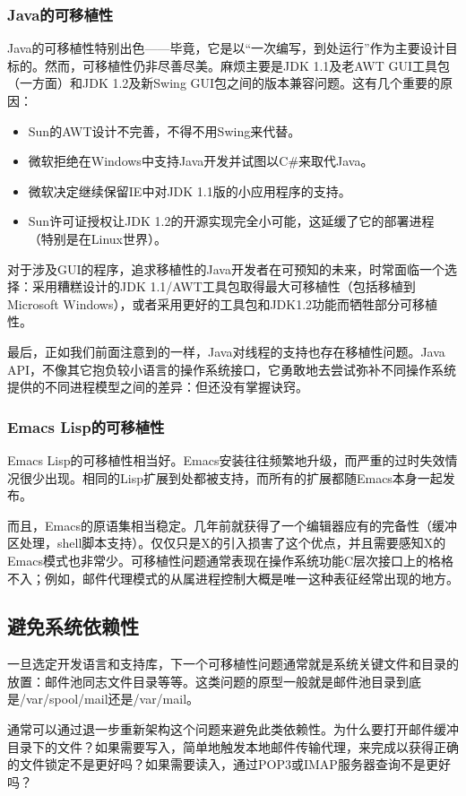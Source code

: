 \documentclass[12pt,oneside]{ctexbook}
\begin{document}
\begin{common-format}
\subsubsection{Java的可移植性}
Java的可移植性特别出色——毕竟，它是以“一次编写，到处运行”作为主要设计目标的。然而，可移植性仍非尽善尽美。麻烦主要是JDK 1.1及老AWT GUI工具包（一方面）和JDK 1.2及新Swing GUI包之间的版本兼容问题。这有几个重要的原因：
\begin{itemize}
\item Sun的AWT设计不完善，不得不用Swing来代替。
\item 微软拒绝在Windows中支持Java开发并试图以C\#{}来取代Java。
\item 微软决定继续保留IE中对JDK 1.1版的小应用程序的支持。
\item Sun许可证授权让JDK 1.2的开源实现完全小可能，这延缓了它的部署进程（特别是在Linux世界）。
\end{itemize}

对于涉及GUI的程序，追求移植性的Java开发者在可预知的未来，时常面临一个选择：采用糟糕设计的JDK 1.1/AWT工具包取得最大可移植性（包括移植到Microsoft Windows），或者采用更好的工具包和JDK1.2功能而牺牲部分可移植性。

最后，正如我们前面注意到的一样，Java对线程的支持也存在移植性问题。Java API，不像其它抱负较小语言的操作系统接口，它勇敢地去尝试弥补不同操作系统提供的不同进程模型之间的差异：但还没有掌握诀窍。

\subsubsection{Emacs Lisp的可移植性}
Emacs Lisp的可移植性相当好。Emacs安装往往频繁地升级，而严重的过时失效情况很少出现。相同的Lisp扩展到处都被支持，而所有的扩展都随Emacs本身一起发布。

而且，Emacs的原语集相当稳定。几年前就获得了一个编辑器应有的完备性（缓冲区处理，shell脚本支持）。仅仅只是X的引入损害了这个优点，并且需要感知X的Emacs模式也非常少。可移植性问题通常表现在操作系统功能C层次接口上的格格不入；例如，邮件代理模式的从属进程控制大概是唯一这种表征经常出现的地方。

\subsection{避免系统依赖性}
一旦选定开发语言和支持库，下一个可移植性问题通常就是系统关键文件和目录的放置：邮件池同志文件目录等等。这类问题的原型一般就是邮件池目录到底是/var/spool/mail还是/var/mail。

通常可以通过退一步重新架构这个问题来避免此类依赖性。为什么要打开邮件缓冲目录下的文件？如果需要写入，简单地触发本地邮件传输代理，来完成以获得正确的文件锁定不是更好吗？如果需要读入，通过POP3或IMAP服务器查询不是更好吗？


\end{common-format}
\end{document}
